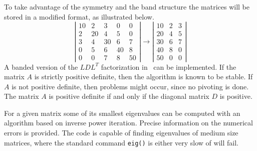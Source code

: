 \documentclass[11pt]{article}
\begin{document}
To take advantage of the symmetry and the band structure the matrices will
be stored in a modified format, as illustrated below.
\[\left|
  \begin{array}{ccccc}
   10&2&3&0&0\\2&20&4&5&0\\3&4&30&6&7\\0&5&6&40&8\\0&0&7&8&50
  \end{array} \right|
\longrightarrow
  \left| \begin{array}{ccc}
   10&2&3\\20&4&5\\30&6&7\\40&8&0\\50&0&0
  \end{array} \right| \]
A banded version of the $LDL^T$ factorization in~\cite{GoluVanLoan96}
can be implemented. If the matrix $A$ is strictly positive definite, then
the algorithm is known to be stable. If $A$ is not positive definite, then
problems might occur, since no pivoting is done. The matrix $A$ is
positive definite if and only if the diagonal matrix $D$ is positive.

For a given matrix some of its smallest eigenvalues can be computed with an
algorithm based on inverse power iteration. Precise information on the
numerical errors is provided. The code is capable of finding eigenvalues of
medium size matrices, where the standard command \texttt{eig()} is either very
slow of will fail.

\end{document}
